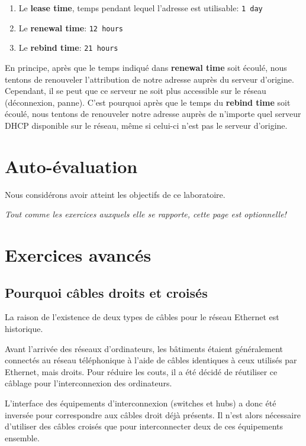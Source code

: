 \documentclass[11pt,a4paper]{article}
\begin{document}
\begin{enumerate}
	\item Le \textbf{lease time}, temps pendant lequel l'adresse est utilisable: \texttt{1 day}
	\item Le \textbf{renewal time}: \texttt{12 hours}
	\item Le \textbf{rebind time}: \texttt{21 hours}
\end{enumerate}

En principe, après que le temps indiqué dans \textbf{renewal time} soit écoulé, nous tentons de renouveler l'attribution de notre adresse auprès du serveur d'origine. Cependant, il se peut que ce serveur ne soit plus accessible sur le réseau (déconnexion, panne). C'est pourquoi après que le temps du \textbf{rebind time} soit écoulé, nous tentons de renouveler notre adresse auprès de n'importe quel serveur DHCP disponible sur le réseau, même si celui-ci n'est pas le serveur d'origine.

\section{Auto-évaluation}

Nous considérons avoir atteint les objectifs de ce laboratoire.

\pagebreak

\textit{Tout comme les exercices auxquels elle se rapporte, cette page est optionnelle!}

\section{Exercices avancés}

\subsection{Pourquoi câbles droits et croisés}

La raison de l'existence de deux types de câbles pour le réseau Ethernet est historique.

Avant l'arrivée des réseaux d'ordinateurs, les bâtiments étaient généralement connectés au réseau téléphonique à l'aide de câbles identiques à ceux utilisés par Ethernet, mais droits. Pour réduire les couts, il a été décidé de réutiliser ce câblage pour l'interconnexion des ordinateurs.

L'interface des équipements d'interconnexion (switches et hubs) a donc été inversée pour correspondre aux câbles droit déjà présents. Il n'est alors nécessaire d'utiliser des câbles croisés que pour interconnecter deux de ces équipements ensemble.
\end{document}
